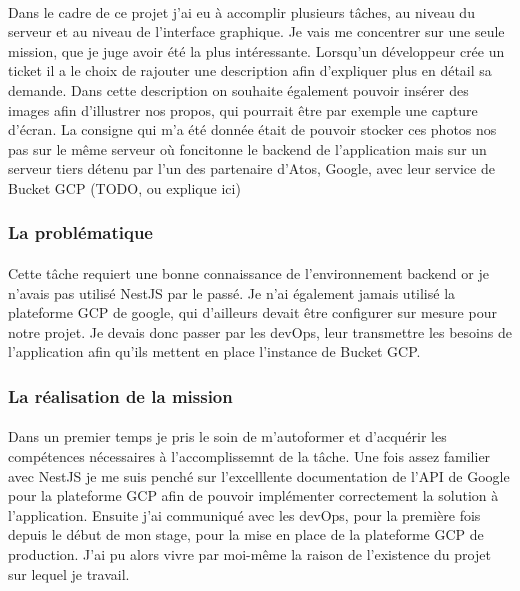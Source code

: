 \documentclass[12pt]{article}
\begin{document}
\begin {sloppypar}
\paragraph{}
Dans le cadre de ce projet j'ai eu à accomplir plusieurs tâches, au niveau du serveur et au niveau de 
l'interface graphique. Je vais me concentrer sur une seule mission, que je juge avoir été la plus 
intéressante. Lorsqu'un développeur crée un ticket il a le choix de rajouter une description afin 
d'expliquer plus en détail sa demande. Dans cette description on souhaite également pouvoir insérer 
des images afin d'illustrer nos propos, qui pourrait être par exemple une capture d'écran. La consigne 
qui m'a été donnée était de pouvoir stocker ces photos nos pas sur le même serveur où foncitonne 
le backend de l'application mais sur un serveur tiers détenu par l'un des partenaire d'Atos, Google, 
avec leur service de Bucket GCP (TODO, ou explique ici)

\subsubsection{La problématique}
\paragraph{}
Cette tâche requiert une bonne connaissance de l'environnement backend or je n'avais pas utilisé 
NestJS par le passé. Je n'ai également jamais utilisé la plateforme GCP de google, qui d'ailleurs 
devait être configurer sur mesure pour notre projet. Je devais donc passer par les devOps,
leur transmettre les besoins de l'application afin qu'ils mettent en place l'instance de Bucket GCP.

\subsubsection{La réalisation de la mission}
\paragraph{}
Dans un premier temps je pris le soin de m'autoformer et d'acquérir les compétences nécessaires 
à l'accomplissemnt de la tâche. Une fois assez familier avec NestJS je me suis penché sur l'excelllente
documentation de l'API de Google pour la plateforme GCP afin de pouvoir implémenter correctement 
la solution à l'application. Ensuite j'ai communiqué avec les devOps, pour la première fois depuis 
le début de mon stage, pour la mise en place de la plateforme GCP de production. J'ai pu alors vivre 
par moi-même la raison de l'existence du projet sur lequel je travail. 


\end{sloppypar}
\end{document}

